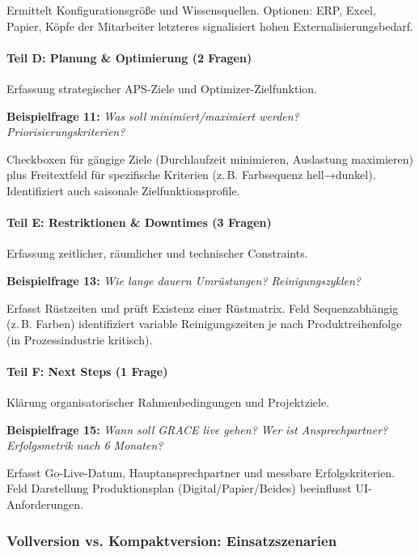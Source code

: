 \noindent Ermittelt Konfigurationsgröße und Wissensquellen. Optionen: ERP, Excel, Papier, \glqq Köpfe der Mitarbeiter\grqq{} letzteres signalisiert hohen Externalisierungsbedarf.

\paragraph{Teil D: Planung \& Optimierung (2 Fragen)}

Erfassung strategischer APS-Ziele und Optimizer-Zielfunktion.

\textbf{Beispielfrage 11:} \textit{\glqq Was soll minimiert/maximiert werden? Priorisierungskriterien?\grqq{}}

\noindent Checkboxen für gängige Ziele (Durchlaufzeit minimieren, Auslastung maximieren) plus Freitextfeld für spezifische Kriterien (z.\,B. \glqq Farbsequenz hell→dunkel\grqq{}). Identifiziert auch saisonale Zielfunktionsprofile.

\paragraph{Teil E: Restriktionen \& Downtimes (3 Fragen)}

Erfassung zeitlicher, räumlicher und technischer Constraints.

\textbf{Beispielfrage 13:} \textit{\glqq Wie lange dauern Umrüstungen? Reinigungszyklen?\grqq{}}

\noindent Erfasst Rüstzeiten und prüft Existenz einer Rüstmatrix. Feld \glqq Sequenzabhängig (z.\,B. Farben)\grqq{} identifiziert variable Reinigungszeiten je nach Produktreihenfolge (in Prozessindustrie kritisch).

\paragraph{Teil F: Next Steps (1 Frage)}

Klärung organisatorischer Rahmenbedingungen und Projektziele.

\textbf{Beispielfrage 15:} \textit{\glqq Wann soll GRACE live gehen? Wer ist Ansprechpartner? Erfolgsmetrik nach 6 Monaten?\grqq{}}

\noindent Erfasst Go-Live-Datum, Hauptansprechpartner und messbare Erfolgskriterien. Feld \glqq Darstellung Produktionsplan\grqq{} (Digital/Papier/Beides) beeinflusst UI-Anforderungen.

\subsubsection{Vollversion vs. Kompaktversion: Einsatzszenarien}


